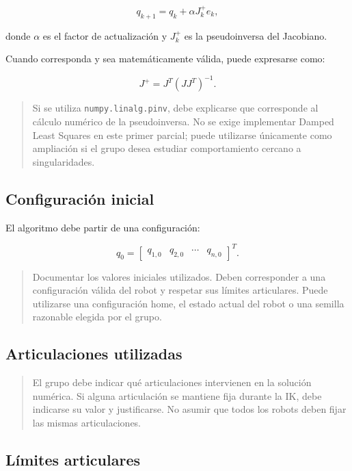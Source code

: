 \documentclass[journal]{IEEEtran}
\newcommand{\instr}[1]{%
\begin{quote}
\small
\noindent\textbf{\color{blue}{INSTRUCCIÓN:}} #1
\end{quote}
}
\begin{document}
\begin{equation}
q_{k+1}
=
q_k + \alpha J_k^{+} e_k,
\label{eq:ik_pinv}
\end{equation}

donde $\alpha$ es el factor de actualización y $J_k^{+}$ es la pseudoinversa del Jacobiano.

Cuando corresponda y sea matemáticamente válida, puede expresarse como:

\begin{equation}
J^{+}=J^T(JJ^T)^{-1}.
\end{equation}

\instr{Si se utiliza \texttt{numpy.linalg.pinv}, debe explicarse que corresponde al cálculo numérico de la pseudoinversa. No se exige implementar Damped Least Squares en este primer parcial; puede utilizarse únicamente como ampliación si el grupo desea estudiar comportamiento cercano a singularidades.}

\subsection{Configuración inicial}

El algoritmo debe partir de una configuración:

\begin{equation}
q_0 =
\begin{bmatrix}
q_{1,0} & q_{2,0} & \cdots & q_{n,0}
\end{bmatrix}^{T}.
\end{equation}

\instr{Documentar los valores iniciales utilizados. Deben corresponder a una configuración válida del robot y respetar sus límites articulares. Puede utilizarse una configuración home, el estado actual del robot o una semilla razonable elegida por el grupo.}

\subsection{Articulaciones utilizadas}

\instr{El grupo debe indicar qué articulaciones intervienen en la solución numérica. Si alguna articulación se mantiene fija durante la IK, debe indicarse su valor y justificarse. No asumir que todos los robots deben fijar las mismas articulaciones.}

\subsection{Límites articulares}
\end{document}
